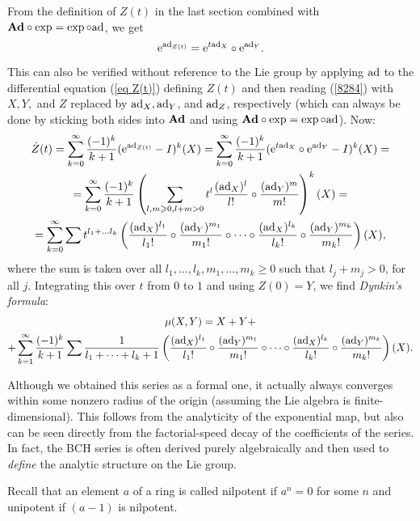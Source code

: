 From the definition of $Z(t)$ in the last section combined with $\mathrm{\mathbf{Ad}}\circ \exp=\exp\circ\mathrm{ad}$, we get
\[\mathrm{e}^{\mathrm{ad}_{Z(t)}}=\mathrm{e}^{t\mathrm{ad}_X}\circ \mathrm{e}^{\mathrm{ad}_Y}.\]
This can also be verified without reference to the Lie group by applying $\mathrm{ad}$ to the differential equation (\ref{eq Z(t)}) defining $Z(t)$ and then reading (\ref{8284}) with $X,Y,$ and $Z$ replaced by $\mathrm{ad}_X,\mathrm{ad}_Y$, and $\mathrm{ad}_Z$, respectively (which can always be done by sticking both sides into $\mathrm{\mathbf{Ad}}$ and using $\mathrm{\mathbf{Ad}}\circ\exp=\exp\circ\mathrm{ad}$). Now:
\begin{multline}
    \dot Z(t)=\sum_{k=0}^\infty \frac{(-1)^k}{k+1}(\mathrm{e}^{\mathrm{ad}_{Z(t)}}-I)^k(X)=\sum_{k=0}^\infty \frac{(-1)^k}{k+1}(\mathrm{e}^{t\mathrm{ad}_X}\circ \mathrm{e}^{\mathrm{ad}_Y}-I)^k(X)=\\
    =\sum_{k=0}^\infty \frac{(-1)^k}{k+1}\left(\sum_{l,m\geqslant 0,l+m>0}t^l\frac{(\mathrm{ad}_X)^l}{l!}\circ \frac{(\mathrm{ad}_Y)^m}{m!}\right)^k (X)=\\
    =\sum_{k=0}^\infty \sum t^{l_1+\ldots l_k}
    \left(
    \frac{(\mathrm{ad}_X)^{l_1}}{l_1!}\circ
    \frac{(\mathrm{ad}_Y)^{m_1}}{m_1!}\circ\cdots\circ
    \frac{(\mathrm{ad}_X)^{l_k}}{l_k!}\circ
    \frac{(\mathrm{ad}_Y)^{m_k}}{m_k!}
    \right)(X),
\end{multline}
where the sum is taken over all $l_1,\ldots,l_k,m_1,\ldots,m_k\geq 0$ such that $l_j+m_j>0$, for all $j$. Integrating this over $t$ from $0$ to $1$ and using $Z(0)=Y$, we find \emph{Dynkin's formula}:
\begin{multline}
    \mu(X,Y)=X+Y+\\+\sum_{k=1}^\infty \frac{(-1)^k}{k+1}\sum \frac{1}{l_1+\cdots+l_k+1}\left(    
    \frac{(\mathrm{ad}_X)^{l_1}}{l_1!}\circ
    \frac{(\mathrm{ad}_Y)^{m_1}}{m_1!}\circ\cdots\circ
    \frac{(\mathrm{ad}_X)^{l_k}}{l_k!}\circ
    \frac{(\mathrm{ad}_Y)^{m_k}}{m_k!}\right)(X).
\end{multline}

\begin{rem}
    Although we obtained this series as a formal one, it actually always converges within some nonzero radius of the origin (assuming the Lie algebra is finite-dimensional). This follows from the analyticity of the exponential map, but also can be seen directly from the factorial-speed decay of the coefficients of the series. In fact, the BCH series is often derived purely algebraically and then used to \emph{define} the analytic structure on the Lie group.
\end{rem}

Recall that an element $a$ of a ring is called nilpotent if $a^n=0$ for some $n$ and unipotent if $(a-1)$ is nilpotent.

